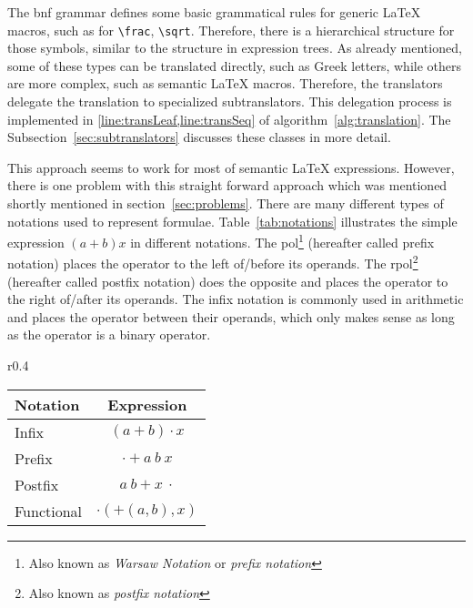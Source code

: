 The \gls*{bnf} grammar defines some basic grammatical rules for generic \LaTeX{} macros, such as for \verb|\frac|, \verb|\sqrt|. Therefore, there is a hierarchical structure for those symbols, similar to the structure in expression trees. As already mentioned, some of these types can be translated directly, such as Greek letters, while others are more complex, such as semantic \LaTeX{} macros. Therefore, the translators delegate the translation to specialized subtranslators. This delegation process is implemented in \cref{line:transLeaf,line:transSeq} of algorithm~\ref{alg:translation}. The Subsection~\ref{sec:subtranslators} discusses these classes in more detail.

This approach seems to work for most of semantic \LaTeX{} expressions. However, there is one problem with this straight forward approach which was mentioned shortly mentioned in section~\ref{sec:problems}. There are many different types of notations used to represent formulae. Table~\ref{tab:notations} illustrates the simple expression $(a+b)x$ in different notations. The \gls*{pol}\footnote{Also known as \textit{Warsaw Notation} or \textit{prefix notation}} (hereafter called prefix notation) places the operator to the left of/before its operands. The \gls*{rpol}\footnote{Also known as \textit{postfix notation}} (hereafter called postfix notation) does the opposite and places the operator to the right of/after its operands. The infix notation is commonly used in arithmetic and places the operator between their operands, which only makes sense as long as the operator is a binary operator.

\begin{wrapfigure}{r}{0.4\textwidth}
\vspace{-22pt}
\begin{minipage}{0.4\textwidth}
\center
\begin{tabular}{lc}
	\hline
	Notation & Expression \\
	\hline
	Infix & $(a+b) \cdot x$\\
	Prefix & $\cdot + a\ b\ x$\\
	Postfix & $a\ b + x\ \cdot$\\
	Functional & $\cdot(+(a, b), x)$\\
	\hline
\end{tabular}
\vspace{-5pt}
\caption{The mathematical expression '$(a+b) \cdot x$' in infix, prefix, postfix and functional notation.}
\label{tab:notations}
\end{minipage}
\vspace{-15pt}
\end{wrapfigure}

